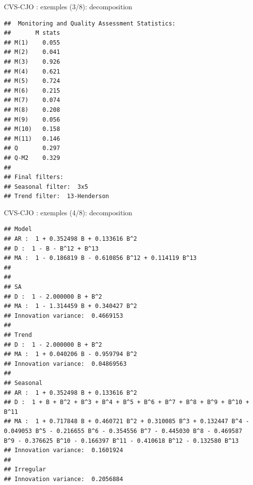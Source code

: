 \documentclass[10pt,xcolor=table,color={dvipsnames,usenames},ignorenonframetext,usepdftitle=false,french]{beamer}
\newenvironment{Shaded}{\begin{snugshade}}{\end{snugshade}}
\newcommand{\NormalTok}[1]{#1}
\newcommand{\OperatorTok}[1]{\textcolor[rgb]{0.81,0.36,0.00}{\textbf{#1}}}
\begin{document}
\begin{frame}[fragile]{CVS-CJO : exemples (3/8): decomposition}
\protect\hypertarget{cvs-cjo-exemples-38-decomposition}{}

\footnotesize

\begin{Shaded}
\end{Shaded}

\begin{verbatim}
##  Monitoring and Quality Assessment Statistics:  
##       M stats
## M(1)    0.055
## M(2)    0.041
## M(3)    0.926
## M(4)    0.621
## M(5)    0.724
## M(6)    0.215
## M(7)    0.074
## M(8)    0.208
## M(9)    0.056
## M(10)   0.158
## M(11)   0.146
## Q       0.297
## Q-M2    0.329
## 
## Final filters: 
## Seasonal filter:  3x5
## Trend filter:  13-Henderson
\end{verbatim}

\end{frame}

\begin{frame}[fragile]{CVS-CJO : exemples (4/8): decomposition}
\protect\hypertarget{cvs-cjo-exemples-48-decomposition}{}

\footnotesize

\begin{Shaded}
\end{Shaded}

\begin{verbatim}
## Model
## AR :  1 + 0.352498 B + 0.133616 B^2 
## D :  1 - B - B^12 + B^13 
## MA :  1 - 0.186819 B - 0.610856 B^12 + 0.114119 B^13 
## 
## 
## SA
## D :  1 - 2.000000 B + B^2 
## MA :  1 - 1.314459 B + 0.340427 B^2 
## Innovation variance:  0.4669153 
## 
## Trend
## D :  1 - 2.000000 B + B^2 
## MA :  1 + 0.040206 B - 0.959794 B^2 
## Innovation variance:  0.04869563 
## 
## Seasonal
## AR :  1 + 0.352498 B + 0.133616 B^2 
## D :  1 + B + B^2 + B^3 + B^4 + B^5 + B^6 + B^7 + B^8 + B^9 + B^10 + B^11 
## MA :  1 + 0.717848 B + 0.460721 B^2 + 0.310085 B^3 + 0.132447 B^4 - 0.049053 B^5 - 0.216655 B^6 - 0.354556 B^7 - 0.445030 B^8 - 0.469587 B^9 - 0.376625 B^10 - 0.166397 B^11 - 0.410618 B^12 - 0.132580 B^13 
## Innovation variance:  0.1601924 
## 
## Irregular
## Innovation variance:  0.2056884
\end{verbatim}

\end{frame}
\end{document}
